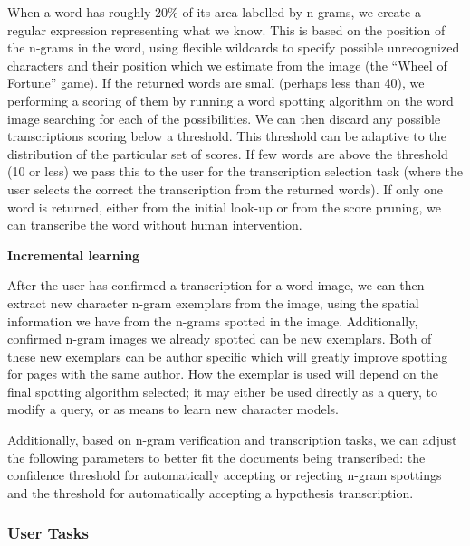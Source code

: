 \documentclass[ms]{byuprop}
\begin{document}
{\begin{addmargin}[3em]{3em}
When a word has roughly 20\% of its area labelled by n-grams, we create a regular expression representing what we know. This is based on the position of the n-grams in the word, using flexible wildcards to specify possible unrecognized characters and their position which we estimate from the image (the ``Wheel of Fortune'' game). If the returned words are small (perhaps less than 40), we performing a scoring of them by running a word spotting algorithm on the word image searching for each of the possibilities. We can then discard any possible transcriptions scoring below a threshold. This threshold can be adaptive to the distribution of the particular set of scores. If few words are above the threshold (10 or less) we pass this to the user for the transcription selection task (where the user selects the correct the transcription from the returned words). If only one word is returned, either from the initial look-up or from the score pruning, we can transcribe the word without human intervention.
\\[.5cm]
\end{addmargin}

\textbf{Incremental learning}

\begin{addmargin}[3em]{3em}
After the user has confirmed a transcription for a word image, we can then extract new character n-gram exemplars from the image, using the spatial information we have from the n-grams spotted in the image. Additionally, confirmed n-gram images we already spotted can be new exemplars. Both of these new exemplars can be author specific which will greatly improve spotting for pages with the same author. How the exemplar is used will depend on the final spotting algorithm selected; it may either be used directly as a query, to modify a query, or as means to learn new character models.

Additionally, based on n-gram verification and transcription tasks, we can adjust the following parameters to better fit the documents being transcribed: the confidence threshold for automatically accepting or rejecting n-gram spottings and the threshold for automatically accepting a hypothesis transcription.
\\[.5cm]
\end{addmargin}
}


\subsubsection{User Tasks}
\end{document}
